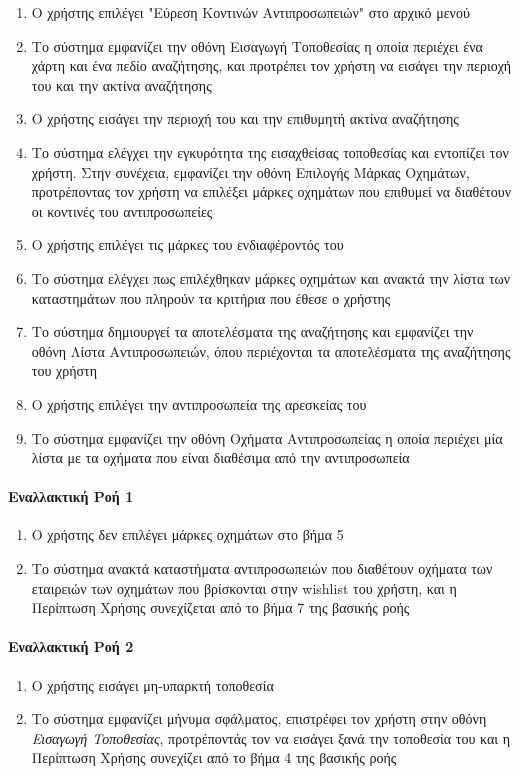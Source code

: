 \documentclass{../ol-softwaremanual}
\begin{document}
	
	\begin{enumerate}
		\item Ο χρήστης επιλέγει  \en"\gr Εύρεση Κοντινών Αντιπροσωπειών\en" \gr στο αρχικό μενού
		\item Το σύστημα εμφανίζει την οθόνη Εισαγωγή Τοποθεσίας η οποία περιέχει ένα χάρτη και ένα πεδίο αναζήτησης, και προτρέπει τον χρήστη να εισάγει την περιοχή του και την ακτίνα αναζήτησης
		\item Ο χρήστης εισάγει την περιοχή του και την επιθυμητή ακτίνα αναζήτησης		
		\item Το σύστημα ελέγχει την εγκυρότητα της εισαχθείσας τοποθεσίας και εντοπίζει τον χρήστη. Στην συνέχεια, εμφανίζει την οθόνη Επιλογής Μάρκας Οχημάτων, προτρέποντας τον χρήστη να επιλέξει μάρκες οχημάτων που επιθυμεί να διαθέτουν οι κοντινές του αντιπροσωπείες
		\item Ο χρήστης επιλέγει τις μάρκες του ενδιαφέροντός του			
		\item Το σύστημα ελέγχει πως επιλέχθηκαν μάρκες οχημάτων και ανακτά την λίστα των καταστημάτων που πληρούν τα κριτήρια που έθεσε ο χρήστης
		\item Το σύστημα δημιουργεί τα αποτελέσματα της αναζήτησης και εμφανίζει την οθόνη Λίστα Αντιπροσωπειών, όπου περιέχονται τα αποτελέσματα της αναζήτησης του χρήστη
		\item Ο χρήστης επιλέγει την αντιπροσωπεία της αρεσκείας του
		\item Το σύστημα εμφανίζει την οθόνη Οχήματα Αντιπροσωπείας η οποία περιέχει μία λίστα με τα οχήματα που είναι διαθέσιμα από την αντιπροσωπεία     	
	\end{enumerate}
	
	\paragraph{Εναλλακτική Ροή 1}
	\begin{enumerate}
		\item Ο χρήστης δεν επιλέγει μάρκες οχημάτων στο βήμα 5
		\item Το σύστημα ανακτά καταστήματα αντιπροσωπειών που διαθέτουν οχήματα των εταιρειών των οχημάτων που βρίσκονται στην \en wishlist \gr του χρήστη, και η Περίπτωση Χρήσης συνεχίζεται από το βήμα 7 της βασικής ροής
	\end{enumerate}
	
	\paragraph{Εναλλακτική Ροή 2}
	\begin{enumerate}
		\item Ο χρήστης εισάγει μη-υπαρκτή τοποθεσία
		\item Το σύστημα εμφανίζει μήνυμα σφάλματος, επιστρέφει τον χρήστη στην οθόνη \textit{Εισαγωγή Τοποθεσίας}, προτρέποντάς τον να εισάγει ξανά την τοποθεσία του και η Περίπτωση Χρήσης συνεχίζει από το βήμα 4 της βασικής ροής		
	\end{enumerate}
	
\end{document}
